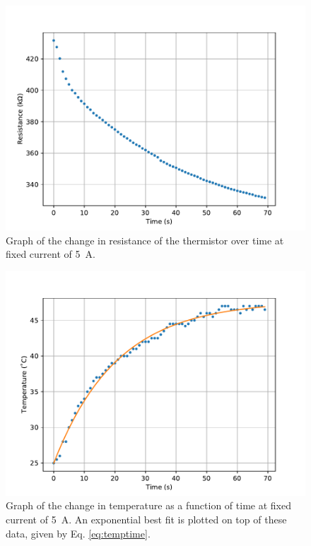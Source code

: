 \begin{figure}[h!]
  \centering
  \includegraphics[width = .8\textwidth]{Images/ResFluct.pdf}
  \caption{Graph of the change in resistance of the thermistor over time at fixed current of \SI{5}{ A}.}
  \label{fig:resfluct}
\end{figure}
\begin{figure}[h!]
  \centering
  \includegraphics[width = .8\textwidth]{Images/TempFluctFit.pdf}
  \caption{Graph of the change in temperature as a function of time at fixed current of \SI{5}{ A}. An exponential best fit is plotted on top of these data, given by Eq. \ref{eq:temptime}.}
  \label{fig:tempflucfit}
\end{figure}

